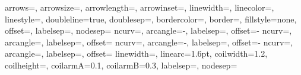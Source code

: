 %
           {arrows=\EdgeArrowSty,%
            arrowsize=\EdgeArrowSZDim,%
            arrowlength=\EdgeArrowSZNum,%
            arrowinset=\EdgeArrowIns,%
            linewidth=\EdgeLineDblCoef\EdgeLineWid,%
            linecolor=\EdgeLineCol,
            linestyle=\EdgeLineSty,%
            doubleline=true,%
            doublesep=\EdgeLineDblSep\EdgeLineWid,%
            bordercolor=\EdgeLineBorderColor,%
            border=\EdgeLineBord,%
            fillstyle=none,%
            offset=\EdgeOff,%
            labelsep=\TransLabelSP,%
            nodesep=\EdgeNodeSP}
%
           {ncurv=\VaucArcCurv,%
            arcangle=-\VaucArcAng,%
            labelsep=\TransLabelSP,%
            offset=-\VaucArcOff}
%
           {ncurv=\VaucArcCurv,%
            arcangle=\VaucArcAng,%
            labelsep=\TransLabelSP,%
            offset=\VaucArcOff}
%
           {ncurv=\VaucLArcCurv,%
            arcangle=-\VaucLArcAng,%
            labelsep=\TransLabelSP,%
            offset=-\VaucArcOff}
%
           {ncurv=\VaucLArcCurv,%
            arcangle=\VaucLArcAng,%
            labelsep=\TransLabelSP,%
            offset=\VaucArcOff}
%
           {linewidth=\ZZLineWid\EdgeLineWid,%
            linearc=1.6pt,%
            coilwidth=1.2\ZZSiZ,%
            coilheight=\ZZShape,%
            coilarmA=0.1\ZZSiZ,%
            coilarmB=0.3\ZZSiZ,%
            labelsep=\TransLabelSP,%
            nodesep=\EdgeNodeSP}
\newcommand{\EdgeStyle}%
   {\ifEdgeLineDbl\psset{style=VaucEdgeDblStyle}%
    \else\psset{style=VaucEdgeStyle}%
    \fi}
\newcommand{\ZigzagStyle}%
   {\addtolength{\TransLabelSP}{\TransLabelZZCoef\ZZSiZ}%
    \psset{style=VaucZigzagStyle}%
    \addtolength{\TransLabelSP}{-\TransLabelZZCoef\ZZSiZ}}
\newcommand{\ChgEdgeOffset}[1]{\setlength{\EdgeOff}{#1}}
\newcommand{\RstEdgeOffset}{\ChgEdgeOffset{\EdgeOffset}}
\newcommand{\SetEdgeOffset}[1]%
   {\setlength{\EdgeOffset}{#1}\RstEdgeOffset}
\newcommand{\ForthBackOffset}%
   {\setlength{\EdgeOff}{\ForthBackEdgeOffset\EdgeLineWid}}
%
\newcommand{\ChgEdgeNodeSep}[1]{\setlength{\EdgeNodeSP}{#1\EdgeNodeSep}}
\newcommand{\RstEdgeNodeSep}{\ChgEdgeNodeSep{1}}
\newcommand{\SetEdgeNodeSep}[1]%
   {\setlength{\EdgeNodeSep}{#1}\RstEdgeNodeSep}
\newcommand{\ChgArcAngle}[1]{\renewcommand{\VaucArcAng}{#1}}
